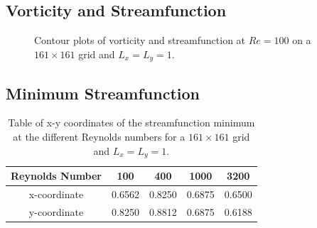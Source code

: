\documentclass[11pt]{article}
\begin{document}
	\subsection{Vorticity and Streamfunction}
	\begin{figure}[htp]
            \centering
            \hfill
            \caption{Contour plots of vorticity and streamfunction at $Re=100$ on a $161 \times 161$ grid and $L_x = L_y = 1$.}
            \label{fig:contours}
        \end{figure}			
	
	\newpage
	\subsection{Minimum Streamfunction}
	\begin{table}[htb]
    	\centering
    	\begin{tabular}{ c | c c c c }
    	\toprule
    	Reynolds Number & 100 & 400 & 1000 & 3200 \\
    	\midrule
		x-coordinate & 0.6562 & 0.8250 & 0.6875 & 0.6500 \\
		y-coordinate & 0.8250 & 0.8812 & 0.6875 & 0.6188  \\
        \bottomrule
        \end{tabular}
        \vspace{0.5em}
        \label{tab:stress}
    	\caption{Table of x-y coordinates of the streamfunction minimum at the different Reynolds numbers for a $161 \times 161$ grid and $L_x = L_y = 1$.}	
	\end{table}
	
\end{document}
